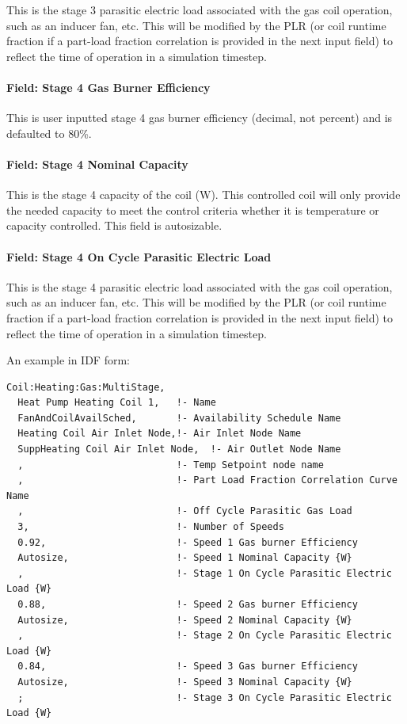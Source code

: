 This is the stage 3 parasitic electric load associated with the gas coil operation, such as an inducer fan, etc. This will be modified by the PLR (or coil runtime fraction if a part-load fraction correlation is provided in the next input field) to reflect the time of operation in a simulation timestep.

\paragraph{Field: Stage 4 Gas Burner Efficiency}\label{field-stage-4-gas-burner-efficiency}

This is user inputted stage 4 gas burner efficiency (decimal, not percent) and is defaulted to 80\%.

\paragraph{Field: Stage 4 Nominal Capacity}\label{field-stage-4-nominal-capacity-1}

This is the stage 4 capacity of the coil (W). This controlled coil will only provide the needed capacity to meet the control criteria whether it is temperature or capacity controlled. This field is autosizable.

\paragraph{Field: Stage 4 On Cycle Parasitic Electric Load}\label{field-stage-4-parasitic-electric-load}

This is the stage 4 parasitic electric load associated with the gas coil operation, such as an inducer fan, etc. This will be modified by the PLR (or coil runtime fraction if a part-load fraction correlation is provided in the next input field) to reflect the time of operation in a simulation timestep.

An example in IDF form:

\begin{lstlisting}
Coil:Heating:Gas:MultiStage,
  Heat Pump Heating Coil 1,   !- Name
  FanAndCoilAvailSched,       !- Availability Schedule Name
  Heating Coil Air Inlet Node,!- Air Inlet Node Name
  SuppHeating Coil Air Inlet Node,  !- Air Outlet Node Name
  ,                           !- Temp Setpoint node name
  ,                           !- Part Load Fraction Correlation Curve Name
  ,                           !- Off Cycle Parasitic Gas Load
  3,                          !- Number of Speeds
  0.92,                       !- Speed 1 Gas burner Efficiency
  Autosize,                   !- Speed 1 Nominal Capacity {W}
  ,                           !- Stage 1 On Cycle Parasitic Electric Load {W}
  0.88,                       !- Speed 2 Gas burner Efficiency
  Autosize,                   !- Speed 2 Nominal Capacity {W}
  ,                           !- Stage 2 On Cycle Parasitic Electric Load {W}
  0.84,                       !- Speed 3 Gas burner Efficiency
  Autosize,                   !- Speed 3 Nominal Capacity {W}
  ;                           !- Stage 3 On Cycle Parasitic Electric Load {W}
\end{lstlisting}


